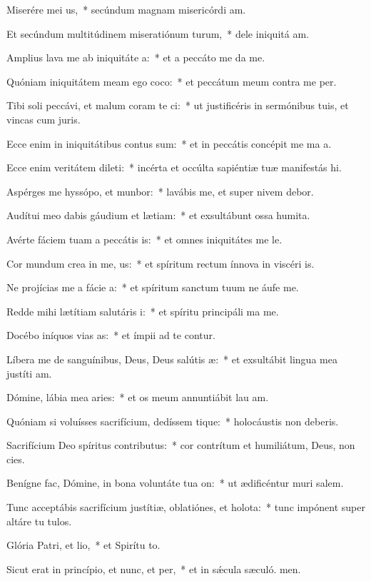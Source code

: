 \item Miserére mei us,~* secúndum magnam misericórdi am.
\item Et secúndum multitúdinem miseratiónum turum,~* dele iniquitá am.
\item Amplius lava me ab iniquitáte a:~* et a peccáto me da me.
\item Quóniam iniquitátem meam ego coco:~* et peccátum meum contra me  per.
\item Tibi soli peccávi, et malum coram te ci:~* ut justificéris in sermónibus tuis, et vincas cum juris.
\item Ecce enim in iniquitátibus contus sum:~* et in peccátis concépit me ma a.
\item Ecce enim veritátem dileti:~* incérta et occúlta sapiéntiæ tuæ manifestás hi.
\item Aspérges me hyssópo, et munbor:~* lavábis me, et super nivem debor.
\item Audítui meo dabis gáudium et lætiam:~* et exsultábunt ossa humita.
\item Avérte fáciem tuam a peccátis is:~* et omnes iniquitátes me le.
\item Cor mundum crea in me, us:~* et spíritum rectum ínnova in viscéri is.
\item Ne projícias me a fácie a:~* et spíritum sanctum tuum ne áufe  me.
\item Redde mihi lætítiam salutáris i:~* et spíritu principáli ma me.
\item Docébo iníquos vias as:~* et ímpii ad te contur.
\item Líbera me de sanguínibus, Deus, Deus salútis æ:~* et exsultábit lingua mea justíti am.
\item Dómine, lábia mea aries:~* et os meum annuntiábit lau am.
\item Quóniam si voluísses sacrifícium, dedíssem tique:~* holocáustis non deberis.
\item Sacrifícium Deo spíritus contributus:~* cor contrítum et humiliátum, Deus, non cies.
\item Benígne fac, Dómine, in bona voluntáte tua on:~* ut ædificéntur muri salem.
\item Tunc acceptábis sacrifícium justítiæ, oblatiónes, et holota:~* tunc impónent super altáre tu tulos.
\item Glória Patri, et lio,~* et Spirítu to.
\item Sicut erat in princípio, et nunc, et per,~* et in sǽcula sæculó. men.
